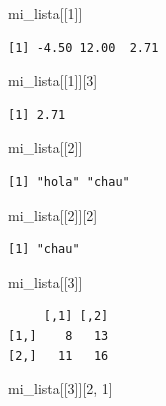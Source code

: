\documentclass[
]{book}
\newenvironment{Shaded}{\begin{snugshade}}{\end{snugshade}}
\newcommand{\DecValTok}[1]{\textcolor[rgb]{0.00,0.00,0.81}{#1}}
\newcommand{\NormalTok}[1]{#1}
\begin{document}
\begin{Shaded}
\begin{Highlighting}[]
\NormalTok{mi\_lista[[}\DecValTok{1}\NormalTok{]]}
\end{Highlighting}
\end{Shaded}

\begin{verbatim}
[1] -4.50 12.00  2.71
\end{verbatim}

\begin{Shaded}
\begin{Highlighting}[]
\NormalTok{mi\_lista[[}\DecValTok{1}\NormalTok{]][}\DecValTok{3}\NormalTok{]}
\end{Highlighting}
\end{Shaded}

\begin{verbatim}
[1] 2.71
\end{verbatim}

\begin{Shaded}
\begin{Highlighting}[]
\NormalTok{mi\_lista[[}\DecValTok{2}\NormalTok{]]}
\end{Highlighting}
\end{Shaded}

\begin{verbatim}
[1] "hola" "chau"
\end{verbatim}

\begin{Shaded}
\begin{Highlighting}[]
\NormalTok{mi\_lista[[}\DecValTok{2}\NormalTok{]][}\DecValTok{2}\NormalTok{]}
\end{Highlighting}
\end{Shaded}

\begin{verbatim}
[1] "chau"
\end{verbatim}

\begin{Shaded}
\begin{Highlighting}[]
\NormalTok{mi\_lista[[}\DecValTok{3}\NormalTok{]]}
\end{Highlighting}
\end{Shaded}

\begin{verbatim}
     [,1] [,2]
[1,]    8   13
[2,]   11   16
\end{verbatim}

\begin{Shaded}
\begin{Highlighting}[]
\NormalTok{mi\_lista[[}\DecValTok{3}\NormalTok{]][}\DecValTok{2}\NormalTok{, }\DecValTok{1}\NormalTok{]}
\end{Highlighting}
\end{Shaded}
\end{document}
